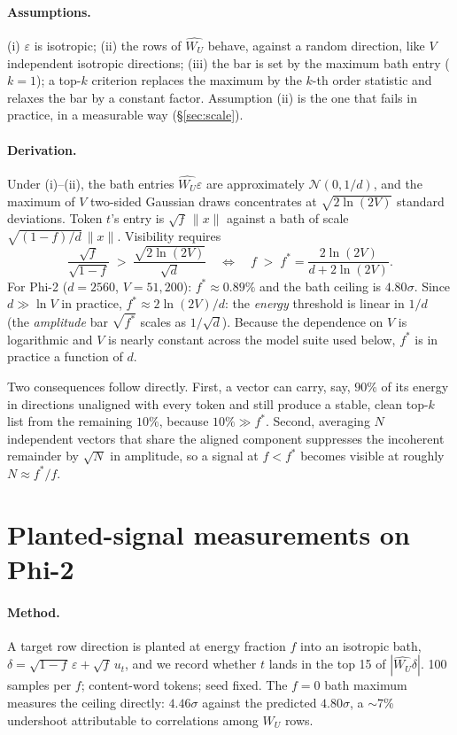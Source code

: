 \documentclass[11pt]{article}
\newcommand{\WU}{W_U}
\newcommand{\fstar}{f^{*}}
\begin{document}
\paragraph{Assumptions.} (i) $\varepsilon$ is isotropic; (ii) the
rows of $\hat{\WU}$ behave, against a random direction, like $V$
independent isotropic directions; (iii) the bar is set by the maximum
bath entry ($k{=}1$); a top-$k$ criterion replaces the maximum by the
$k$-th order statistic and relaxes the bar by a constant factor.
Assumption (ii) is the one that fails in practice, in a measurable
way (\S\ref{sec:scale}).

\paragraph{Derivation.} Under (i)--(ii), the bath entries
$\hat{\WU}\varepsilon$ are approximately $\mathcal{N}(0, 1/d)$, and
the maximum of $V$ two-sided Gaussian draws concentrates at
$\sqrt{2\ln(2V)}$ standard deviations. Token $t$'s entry is
$\sqrt{f}\,\|x\|$ against a bath of scale
$\sqrt{(1-f)/d}\,\|x\|$. Visibility requires
\[
\frac{\sqrt{f}}{\sqrt{1-f}} \;>\; \frac{\sqrt{2\ln(2V)}}{\sqrt{d}}
\quad\Longleftrightarrow\quad
f \;>\; \fstar = \frac{2\ln(2V)}{d + 2\ln(2V)}.
\]
For Phi-2 ($d{=}2560$, $V{=}51{,}200$): $\fstar \approx 0.89\%$ and
the bath ceiling is $4.80\sigma$. Since $d \gg \ln V$ in practice,
$\fstar \approx 2\ln(2V)/d$: the \emph{energy} threshold is linear in
$1/d$ (the \emph{amplitude} bar $\sqrt{\fstar}$ scales as
$1/\sqrt{d}$). Because the dependence on $V$ is logarithmic and $V$
is nearly constant across the model suite used below, $\fstar$ is in
practice a function of $d$.

Two consequences follow directly. First, a vector can carry, say,
$90\%$ of its energy in directions unaligned with every token and
still produce a stable, clean top-$k$ list from the remaining $10\%$,
because $10\% \gg \fstar$. Second, averaging $N$ independent vectors
that share the aligned component suppresses the incoherent remainder
by $\sqrt{N}$ in amplitude, so a signal at $f < \fstar$ becomes
visible at roughly $N \approx \fstar/f$.

\section{Planted-signal measurements on Phi-2}
\label{sec:planted}

\paragraph{Method.} A target row direction is planted at energy
fraction $f$ into an isotropic bath,
$\delta = \sqrt{1-f}\,\varepsilon + \sqrt{f}\,u_t$, and we record
whether $t$ lands in the top 15 of $|\hat{\WU}\delta|$. 100 samples
per $f$; content-word tokens; seed fixed. The $f{=}0$ bath maximum
measures the ceiling directly: $4.46\sigma$ against the predicted
$4.80\sigma$, a $\sim$7\% undershoot attributable to correlations
among $\WU$ rows.
\end{document}
